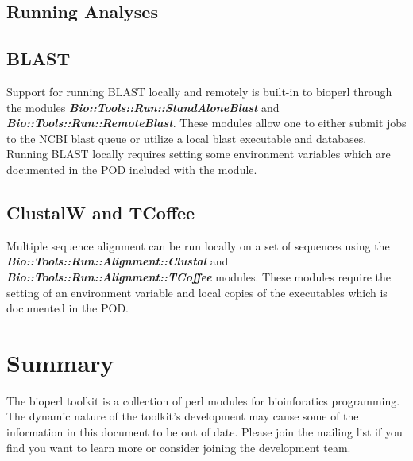 \documentclass{article}
\begin{document}
\subsection{Running Analyses}

\subsection{BLAST}
Support for running BLAST locally and remotely is built-in to bioperl
through the modules \emph{\bf Bio::Tools::Run::StandAloneBlast} and
\emph{\bf Bio::Tools::Run::RemoteBlast}.  These modules allow one to
either submit jobs to the NCBI blast queue or utilize a local blast
executable and databases.   Running BLAST locally requires setting
some environment variables which are documented in the POD included
with the module.

\subsection{ClustalW and TCoffee}
Multiple sequence alignment can be run locally on a set of sequences
using the \emph{\bf Bio::Tools::Run::Alignment::Clustal} and
\emph{\bf Bio::Tools::Run::Alignment::TCoffee} modules.  These modules
require the setting of an environment variable and local copies of the
executables which is documented in the POD.  

\section{Summary}

The bioperl toolkit is a collection of perl modules for bioinforatics
programming.  The dynamic nature of the toolkit's development may
cause some of the information in this document to be out of date.
Please join the mailing list if you find you want to learn more or
consider joining the development team.
\end{document}
